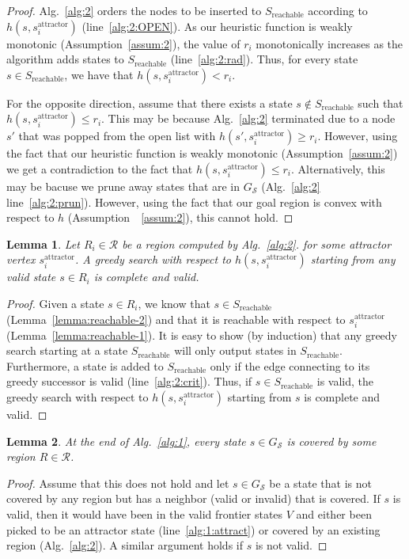 \documentclass[letterpaper]{article} %
\newcommand{\calS}{\ensuremath{\mathcal{S}}\xspace}
\newcommand{\calR}{\ensuremath{\mathcal{R}}\xspace}
\newcommand{\sAttract}{\ensuremath{s^{\text{attractor}}_i}\xspace}
\newtheorem{lemma}{Lemma}
\begin{document}
\begin{proof}
Alg.~\ref{alg:2} orders the nodes to be inserted to $S_{\text{reachable}}$ according to $h(s, \sAttract)$ (line~\ref{alg:2:OPEN}).
As our heuristic function is weakly monotonic (Assumption~\ref{assum:2}), the value of $r_i$ monotonically increases as the algorithm adds states to $S_{\text{reachable}}$ (line~\ref{alg:2:rad}).
Thus, for every state $s \in S_{\text{reachable}}$, we have that $h(s, \sAttract) < r_i$.

For the opposite direction, assume that there exists a state $s \notin S_{\text{reachable}}$ such that $h(s, \sAttract) \leq r_i$.
This may be because  Alg.~\ref{alg:2} terminated due to a node $s'$ that was popped from the open list with 
$h(s', \sAttract) \geq r_i$.
However, using the fact that our heuristic function is weakly monotonic (Assumption~\ref{assum:2}) we get a contradiction to the fact that $h(s, \sAttract) \leq r_i$.
Alternatively, this may be bacuse we prune away states that are in $G_\calS$  (Alg.~\ref{alg:2} line~\ref{alg:2:prun}). 
However, using the fact that our goal region is convex with respect to $h$ (Assumption~~\ref{assum:2}), this cannot hold.
\end{proof}

\begin{lemma}
\label{lemma:greedy}
Let $R_i \in \calR$ be a region computed by Alg.~\ref{alg:2}.
for some attractor vertex \sAttract.
% 
A greedy search with respect to $h(s, \sAttract)$  starting from any valid state $s \in R_i$ is complete and valid.
\end{lemma}

\begin{proof}
Given a state $s \in R_i$, we know that $s \in S_{\text{reachable}}$ (Lemma~\ref{lemma:reachable-2})
and that it is reachable with respect to \sAttract (Lemma~\ref{lemma:reachable-1}).
%
It is easy to show (by induction) that any greedy search starting at a state $S_{\text{reachable}}$ will only output states in $S_{\text{reachable}}$.
Furthermore, a state is added to $S_{\text{reachable}}$ only if the edge connecting to its greedy successor is valid (line~\ref{alg:2:crit}).
Thus, if $s\in S_{\text{reachable}}$ is valid, the greedy search with respect to $h(s, \sAttract)$  starting from $s$ is complete and valid.
\end{proof}

\begin{lemma}
\label{lemma:coverage}
At the end of Alg.~\ref{alg:1}, every state $s \in G_\calS$ is covered by some region $R \in \calR$.
\end{lemma}
\begin{proof}
Assume that this does not hold and let $s \in G_\calS$ be a state that is not covered by any region but has a neighbor (valid or invalid) that is covered.
%
If $s$ is valid, then it would have been in the valid frontier states $V$ and either been picked to be an attractor state (line~\ref{alg:1:attract}) or covered by an existing region (Alg.~\ref{alg:2}).
%
A similar argument holds if $s$ is not valid.
\end{proof}
\end{document}
